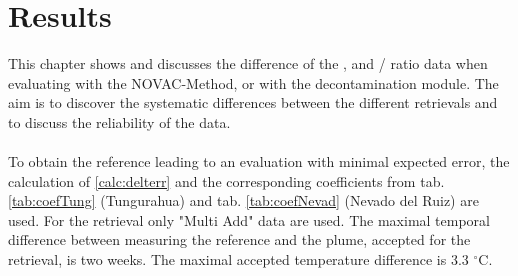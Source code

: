 \documentclass  [
  paper    = a4,
  BCOR     = 10mm,
  twoside,
  fontsize = 12pt,
  fleqn,
  toc      = bibnumbered,
  toc      = listofnumbered,
  numbers  = noendperiod,
  headings = normal,
  listof   = leveldown,
  version  = 3.03
]                                       {scrreprt}
\begin{document}
	
	
	

	
	\chapter{Results}
	This chapter shows and discusses the difference of the ,  and /  ratio data when evaluating with the NOVAC-Method, or with the decontamination module.
	The aim is to discover the systematic differences between the different retrievals and to discuss the reliability of the data.\\
	\\
	To obtain the reference leading to an evaluation with minimal expected   error, the calculation of \cref{calc:delterr} and the corresponding coefficients from tab. \ref{tab:coefTung} (Tungurahua) and tab. \ref{tab:coefNevad} (Nevado del Ruiz) are used. 
	For the retrieval only "Multi Add" data are used. The maximal temporal difference between measuring the reference and the plume, accepted for the retrieval, is two weeks. The maximal accepted temperature difference is 3.3 $^{\circ}$C.\\
	\\
\end{document}
